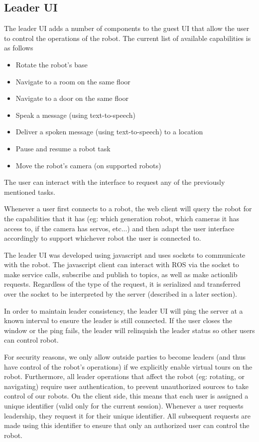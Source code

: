 \documentclass{sig-alternate-05-2015}
\begin{document}
\subsection{Leader UI}

The leader UI adds a number of components to the guest UI that allow the user to
control the operations of the robot. The current list of available capabilities
is as follows

\begin{itemize}
  \item Rotate the robot's base
  \item Navigate to a room on the same floor
  \item Navigate to a door on the same floor
  \item Speak a message (using text-to-speech)
  \item Deliver a spoken message (using text-to-speech) to a location
  \item Pause and resume a robot task
  \item Move the robot's camera (on supported robots)
\end{itemize}

The user can interact with the interface to request any of the previously
mentioned tasks.

Whenever a user first connects to a robot, the web client will query the robot
for the capabilities that it has (eg: which generation robot, which cameras it
has access to, if the camera has servos, etc...) and then adapt the user
interface accordingly to support whichever robot the user is connected to.

The leader UI was developed using javascript and uses sockets to
communicate with the robot. The javascript client can interact with ROS via the
socket to make service calls, subscribe and publish to topics, as well as make
actionlib requests. Regardless of the type of the request, it is serialized and
transferred over the socket to be interpreted by the server (described in a
later section).

In order to maintain leader consistency, the leader UI will ping the server at
a known interval to ensure the leader is still connected. If the user closes
the window or the ping fails, the leader will relinquish the leader status so
other users can control robot.

For security reasons, we only allow outside parties to become leaders (and thus
have control of the robot's operations) if we explicitly enable virtual tours
on the robot. Furthermore, all leader operations that affect the robot (eg:
rotating, or navigating) require user authentication, to prevent unauthorized
sources to take control of our robots. On the client side, this means that each
user is assigned a unique identifier (valid only for the current session).
Whenever a user requests leadership, they request it for their unique
identifier. All subsequent requests are made using this identifier to ensure
that only an authorized user can control the robot.
\end{document}
